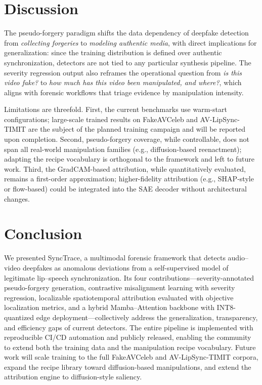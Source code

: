 \documentclass[sn-basic,Numbered,referee]{sn-jnl}
\begin{document}
\section{Discussion}
\label{sec:discussion}

The pseudo-forgery paradigm shifts the data dependency of deepfake detection from \emph{collecting forgeries} to \emph{modeling authentic media}, with direct implications for generalization: since the training distribution is defined over authentic synchronization, detectors are not tied to any particular synthesis pipeline. The severity regression output also reframes the operational question from \textit{is this video fake?} to \textit{how much has this video been manipulated, and where?}, which aligns with forensic workflows that triage evidence by manipulation intensity.

Limitations are threefold. First, the current benchmarks use warm-start configurations; large-scale trained results on FakeAVCeleb and AV-LipSync-TIMIT are the subject of the planned training campaign and will be reported upon completion. Second, pseudo-forgery coverage, while controllable, does not span all real-world manipulation families (e.g., diffusion-based reenactment); adapting the recipe vocabulary is orthogonal to the framework and left to future work. Third, the GradCAM-based attribution, while quantitatively evaluated, remains a first-order approximation; higher-fidelity attribution (e.g., SHAP-style or flow-based) could be integrated into the SAE decoder without architectural changes.

\section{Conclusion}
\label{sec:conclusion}

We presented SyncTrace, a multimodal forensic framework that detects audio--video deepfakes as anomalous deviations from a self-supervised model of legitimate lip--speech synchronization. Its four contributions---severity-annotated pseudo-forgery generation, contrastive misalignment learning with severity regression, localizable spatiotemporal attribution evaluated with objective localization metrics, and a hybrid Mamba--Attention backbone with INT8-quantized edge deployment---collectively address the generalization, transparency, and efficiency gaps of current detectors. The entire pipeline is implemented with reproducible CI/CD automation and publicly released, enabling the community to extend both the training data and the manipulation recipe vocabulary. Future work will scale training to the full FakeAVCeleb and AV-LipSync-TIMIT corpora, expand the recipe library toward diffusion-based manipulations, and extend the attribution engine to diffusion-style saliency.
\end{document}
